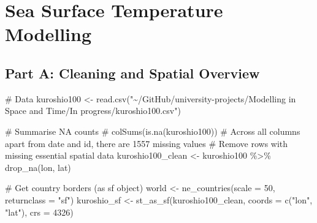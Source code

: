 \documentclass[
  11pt,
]{article}
\newenvironment{Shaded}{\begin{snugshade}}{\end{snugshade}}
\newcommand{\AttributeTok}[1]{\textcolor[rgb]{0.40,0.45,0.13}{#1}}
\newcommand{\CommentTok}[1]{\textcolor[rgb]{0.37,0.37,0.37}{#1}}
\newcommand{\DecValTok}[1]{\textcolor[rgb]{0.68,0.00,0.00}{#1}}
\newcommand{\FunctionTok}[1]{\textcolor[rgb]{0.28,0.35,0.67}{#1}}
\newcommand{\NormalTok}[1]{\textcolor[rgb]{0.00,0.23,0.31}{#1}}
\newcommand{\OtherTok}[1]{\textcolor[rgb]{0.00,0.23,0.31}{#1}}
\newcommand{\SpecialCharTok}[1]{\textcolor[rgb]{0.37,0.37,0.37}{#1}}
\newcommand{\StringTok}[1]{\textcolor[rgb]{0.13,0.47,0.30}{#1}}
\renewcommand*\contentsname{Table of contents}
\newcommand\contentsname{Table of contents}
\begin{document}
\renewcommand*\contentsname{Table of contents}
{
\hypersetup{linkcolor=}
\setcounter{tocdepth}{3}
\tableofcontents
}

\newpage

\section{Sea Surface Temperature
Modelling}\label{sea-surface-temperature-modelling}

\subsection{Part A: Cleaning and Spatial
Overview}\label{part-a-cleaning-and-spatial-overview}

\begin{Shaded}
\begin{Highlighting}[]
\CommentTok{\# Data}
\NormalTok{kuroshio100 }\OtherTok{\textless{}{-}} \FunctionTok{read.csv}\NormalTok{(}\StringTok{"\textasciitilde{}/GitHub/university{-}projects/Modelling in Space and Time/In progress/kuroshio100.csv"}\NormalTok{)}

\CommentTok{\# Summarise NA counts}
\CommentTok{\# colSums(is.na(kuroshio100))}
\CommentTok{\# Across all columns apart from \textasciigrave{}date\textasciigrave{} and \textasciigrave{}id\textasciigrave{}, there are 1557 missing values}
\CommentTok{\# Remove rows with missing essential spatial data}
\NormalTok{kuroshio100\_clean }\OtherTok{\textless{}{-}}\NormalTok{ kuroshio100 }\SpecialCharTok{\%\textgreater{}\%} \FunctionTok{drop\_na}\NormalTok{(lon, lat)}

\CommentTok{\# Get country borders (as \textquotesingle{}sf\textquotesingle{} object)}
\NormalTok{world }\OtherTok{\textless{}{-}} \FunctionTok{ne\_countries}\NormalTok{(}\AttributeTok{scale =} \DecValTok{50}\NormalTok{, }\AttributeTok{returnclass =} \StringTok{"sf"}\NormalTok{)}
\NormalTok{kuroshio\_sf }\OtherTok{\textless{}{-}} \FunctionTok{st\_as\_sf}\NormalTok{(kuroshio100\_clean, }\AttributeTok{coords =} \FunctionTok{c}\NormalTok{(}\StringTok{"lon"}\NormalTok{, }\StringTok{"lat"}\NormalTok{), }\AttributeTok{crs =} \DecValTok{4326}\NormalTok{)}


\end{Highlighting}
\end{Shaded}
\end{document}
